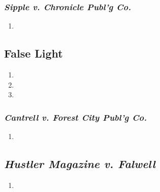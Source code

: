 \subsubsection{\emph{Sipple v. Chronicle Publ'g Co.}}

\begin{enumerate}
    \item %
\end{enumerate}

\subsection{False Light}

\begin{enumerate}
    \item  %
    \item %
    \item %
\end{enumerate}

\subsubsection{\emph{Cantrell v. Forest City Publ'g Co.}}

\begin{enumerate}
    \item %
\end{enumerate}

\subsection{\emph{Hustler Magazine v. Falwell}}

\begin{enumerate}
    \item %
\end{enumerate}
